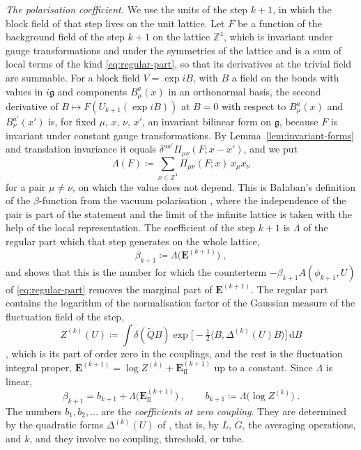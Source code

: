 \documentclass[11pt]{preprint}
\newcommand{\dd}{\mathrm{d}}
\numberwithin{equation}{section}
\theoremstyle{definition}
\theoremstyle{remark}
\theoremstyle{plain}
\begin{document}
\emph{The polarisation coefficient.} We use the units of the step $k + 1$, in which the block field of that step lives on the unit lattice. Let $F$ be a function of the background field of the step $k + 1$ on the lattice $\mathbb Z^4$, which is invariant under gauge transformations and under the symmetries of the lattice and is a sum of local terms of the kind \eqref{eq:regular-part}, so that its derivatives at the trivial field are summable. For a block field $V = \exp iB$, with $B$ a field on the bonds with values in $i\mathfrak g$ and components $B^a_\mu(x)$ in an orthonormal basis, the second derivative of $B \mapsto F(U_{k+1}(\exp iB))$ at $B = 0$ with respect to $B^a_\mu(x)$ and $B^{a'}_\nu(x')$ is, for fixed $\mu$, $x$, $\nu$, $x'$, an invariant bilinear form on $\mathfrak g$, because $F$ is invariant under constant gauge transformations. By Lemma~\ref{lem:invariant-forms} and translation invariance it equals $\delta^{aa'}\Pi_{\mu\nu}(F; x - x')$, and we put
\begin{equation}\label{eq:polarisation-coefficient}
    \Lambda(F) \coloneqq \sum_{x \in \mathbb Z^4}\Pi_{\mu\nu}(F; x)\,x_\mu x_\nu
\end{equation}
for a pair $\mu \neq \nu$, on which the value does not depend. This is Ba{\l}aban's definition of the $\beta$-function from the vacuum polarisation \cite[(1.20)--(1.22), p.~264]{BalabanRG1}, where the independence of the pair is part of the statement and the limit of the infinite lattice is taken with the help of the local representation. The coefficient of the step $k + 1$ is $\Lambda$ of the regular part which that step generates on the whole lattice,
\begin{equation}\label{eq:beta-definition}
    \beta_{k+1} \coloneqq \Lambda\bigl(\mathbf E^{(k+1)}\bigr)\;,
\end{equation}
and \cite[(3.57)--(3.64), pp.~281--283]{BalabanCRE} shows that this is the number for which the counterterm $-\beta_{k+1}A(\phi_{k+1}, U)$ of \eqref{eq:regular-part} removes the marginal part of $\mathbf E^{(k+1)}$. The regular part contains the logarithm of the normalisation factor of the Gaussian measure of the fluctuation field of the step,
\begin{equation}\label{eq:gaussian-normalisation}
    Z^{(k)}(U) \coloneqq \int\delta(\tilde QB)\exp\bigl[-\tfrac12\langle B, \Delta^{(k)}(U)B \rangle\bigr]\,\dd B
\end{equation}
\cite[(1.3), (1.4), p.~260]{BalabanRG1}, which is its part of order zero in the couplings, and the rest is the fluctuation integral proper, $\mathbf E^{(k+1)} = \log Z^{(k)} + \mathbf E^{(k+1)}_{\mathrm{fl}}$ up to a constant. Since $\Lambda$ is linear,
\begin{equation}\label{eq:beta-split}
    \beta_{k+1} = b_{k+1} + \Lambda\bigl(\mathbf E^{(k+1)}_{\mathrm{fl}}\bigr)\;,
    \qquad
    b_{k+1} \coloneqq \Lambda\bigl(\log Z^{(k)}\bigr)\;.
\end{equation}
The numbers $b_1, b_2, \dots$ are the \emph{coefficients at zero coupling}. They are determined by the quadratic forms $\Delta^{(k)}(U)$ of \cite[(1.5), p.~261]{BalabanRG1}, that is, by $L$, $G$, the averaging operations, and $k$, and they involve no coupling, threshold, or tube.
\end{document}
